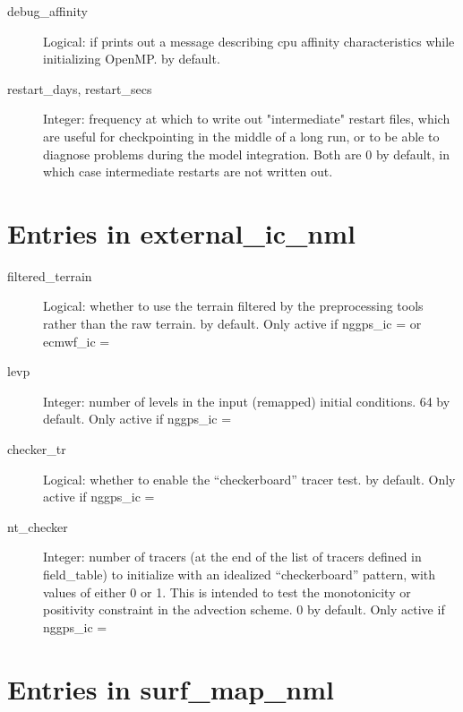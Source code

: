 \documentclass[12pt,letterpaper]{book}
\begin{document}
\begin{description}
\item[debug\_affinity] Logical: if \true  prints out a message describing cpu affinity characteristics while initializing OpenMP. \false  by default.

\item[restart\_days, restart\_secs] Integer: frequency at which to write out "intermediate" restart files, which are useful for checkpointing in the middle of a long run, or to be able to diagnose problems during the model integration. Both are 0 by default, in which case intermediate restarts are not written out.
                          
\end{description}

\section{Entries in external\_ic\_nml}


\begin{description}

\item[filtered\_terrain] Logical: whether to use the terrain filtered by the preprocessing tools rather than the raw terrain. \true  by default. Only active if nggps\_ic = \true  or ecmwf\_ic = \true 

\item[levp] Integer: number of levels in the input (remapped) initial conditions. 64 by default. Only active if nggps\_ic = \true 

\item[checker\_tr] Logical: whether to enable the ``checkerboard'' tracer test. \false  by default. Only active if nggps\_ic = \true 

\item[nt\_checker] Integer: number of tracers (at the end of the list of tracers defined in field\_table) to initialize with an idealized ``checkerboard'' pattern, with values of either 0 or 1. This is intended to test the monotonicity or positivity constraint in the advection scheme. 0 by default. Only active if nggps\_ic = \true 

\end{description}

\section{Entries in surf\_map\_nml}
\end{document}
